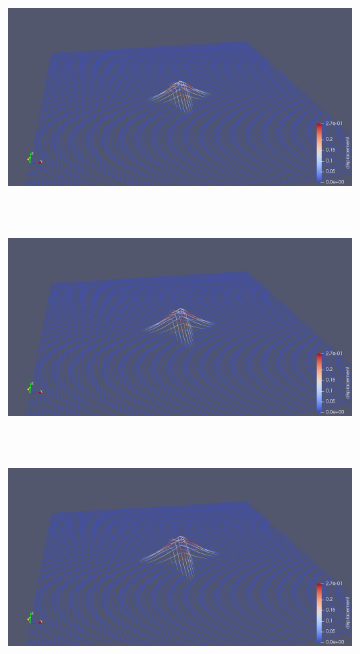 \begin{figure}[H]
\begin{subfigure}[t]{0.5\textwidth}
    \end{subfigure}%
    ~
    \begin{subfigure}[t]{0.5\textwidth}
        \centering
        \includegraphics[width=\textwidth]{img/fiber/density_1_radius_1_amplitude_0.1/4.png}
    \end{subfigure}
    ~
    \begin{subfigure}[t]{0.5\textwidth}
        \centering
        \includegraphics[width=\textwidth]{img/fiber/density_1_radius_1_amplitude_0.1/5.png}
    \end{subfigure}%
    ~
    \begin{subfigure}[t]{0.5\textwidth}
        \centering
        \includegraphics[width=\textwidth]{img/fiber/density_1_radius_1_amplitude_0.1/6.png}
    \end{subfigure}
\end{figure}

